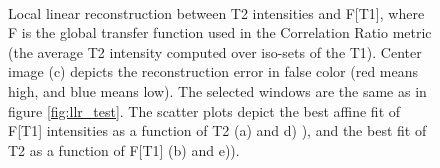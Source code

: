 \begin{figure}[t!]
\centering
    \\
    \caption{Local linear reconstruction between T2 intensities and F[T1], where F is the global transfer function used in the Correlation Ratio metric (the average T2 intensity computed over iso-sets of the T1). Center image (c) depicts the reconstruction error in false color (red means high, and blue means low). The selected windows are the same as in figure \ref{fig:llr_test}. The scatter plots depict the best affine fit of F[T1] intensities as a function of T2 (a) and d) ), and the best fit of T2 as a function of F[T1] (b) and e)).}
\label{fig:ecc_test_good}
\end{figure}

